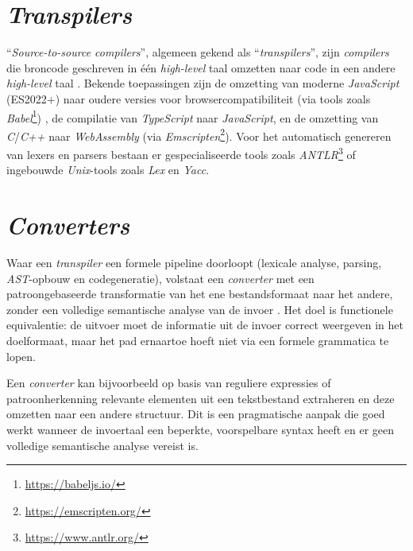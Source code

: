 \section{\emph{Transpilers}}%
\label{sec:transpilers}
``\emph{Source-to-source compilers}'', algemeen gekend als ``\emph{transpilers}'', zijn \emph{compilers} die broncode geschreven in één \emph{high-level} taal omzetten naar code in een andere \emph{high-level} taal \autocite{Freitas2025}. Bekende toepassingen zijn de omzetting van moderne \emph{JavaScript} (ES2022+) naar oudere versies voor browsercompatibiliteit (via tools zoals \emph{Babel}\footnote{\url{https://babeljs.io/}}) \autocite{Nicolini2024}, de compilatie van \emph{TypeScript} naar \emph{JavaScript}, en de omzetting van \emph{C}/\emph{C++} naar \emph{WebAssembly} (via \emph{Emscripten}\footnote{\url{https://emscripten.org/}}). Voor het automatisch genereren van lexers en parsers bestaan er gespecialiseerde tools zoals \emph{ANTLR}\footnote{\url{https://www.antlr.org/}} of ingebouwde \emph{Unix}-tools zoals \emph{Lex} en \emph{Yacc}.

\section{\emph{Converters}}%
\label{sec:converters}

Waar een \emph{transpiler} een formele pipeline doorloopt (lexicale analyse, parsing, \emph{AST}-opbouw en codegeneratie), volstaat een \emph{converter} met een patroongebaseerde transformatie van het ene bestandsformaat naar het andere, zonder een volledige semantische analyse van de invoer \autocite{Plaisted2013}. Het doel is functionele equivalentie: de uitvoer moet de informatie uit de invoer correct weergeven in het doelformaat, maar het pad ernaartoe hoeft niet via een formele grammatica te lopen.

Een \emph{converter} kan bijvoorbeeld op basis van reguliere expressies of patroonherkenning relevante elementen uit een tekstbestand extraheren en deze omzetten naar een andere structuur. Dit is een pragmatische aanpak die goed werkt wanneer de invoertaal een beperkte, voorspelbare syntax heeft en er geen volledige semantische analyse vereist is.

